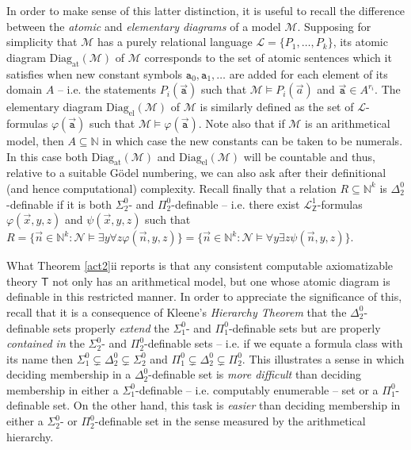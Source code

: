 \documentclass[11pt,fleqn,leqno]{article}
\def\phi{\varphi}
\begin{document}
In order to make sense of this latter distinction, it is useful to recall the difference between the \textsl{atomic} and \textsl{elementary diagrams} of a model $\mathcal{M}$.  Supposing for simplicity that $\mathcal{M}$ has a purely relational language $\mathcal{L} = \{P_1,\ldots,P_k\}$, its atomic diagram $\mathrm{Diag}_{\mathrm{at}}(\mathcal{M})$ of $\mathcal{M}$ corresponds to the set of atomic sentences which it satisfies when new constant symbols $\texttt{a}_0,\texttt{a}_1,\ldots$ are added for each element of its domain $A$ -- i.e. the statements $P_i(\vec{\texttt{a}})$ such that $\mathcal{M} \models P_i(\vec{a})$ and $\vec{\texttt{a}} \in A^{r_i}$.   The elementary diagram $\mathrm{Diag}_{\mathrm{el}}(\mathcal{M})$ of $\mathcal{M}$ is similarly defined as the set of $\mathcal{L}$-formulas $\phi(\vec{\texttt{a}})$ such that $\mathcal{M} \models \phi(\vec{\texttt{a}})$.   Note also that if $\mathcal{M}$ is an arithmetical model, then $A \subseteq \mathbb{N}$ in which case the new constants can be taken to be numerals.   In this case both  $\mathrm{Diag}_{\mathrm{at}}(\mathcal{M})$ and  $\mathrm{Diag}_{\mathrm{el}}(\mathcal{M})$ will be countable and thus, relative to a suitable G\"odel numbering, we can also ask after their definitional (and hence computational) complexity.   Recall finally that a relation $R \subseteq \mathbb{N}^k$ is $\Delta^0_2$-definable if it is both $\Sigma^0_2$- and $\Pi^0_2$-definable -- i.e. there exist $\mathcal{L}^1_{\mathsf{Z}}$-formulas $\phi(\vec{x},y,z)$ and $\psi(\vec{x},y,z)$ such that $R = \{\vec{n} \in \mathbb{N}^k : \mathcal{N} \models \exists y \forall z \phi(\vec{n},y,z)\} =   \{\vec{n} \in \mathbb{N}^k : \mathcal{N} \models \forall y \exists z \psi(\vec{n},y,z)\}$.  

What Theorem \ref{act2}ii reports is  that any consistent computable axiomatizable theory $\mathsf{T}$ not only has an arithmetical model, but one whose atomic diagram is definable in this restricted manner.  In order to appreciate the significance of this, recall that it is a consequence of Kleene's \textsl{Hierarchy Theorem} that the $\Delta^0_2$-definable sets properly \textsl{extend} the $\Sigma^0_1$- and $\Pi^0_1$-definable sets but are properly \textsl{contained in} the $\Sigma^0_2$- and $\Pi^0_2$-definable sets -- i.e. if we equate a formula class with its name then $\Sigma^0_1 \varsubsetneq \Delta^0_2 \subsetneq \Sigma^0_2$ and $\Pi^0_1 \subsetneq \Delta^0_2 \subsetneq \Pi^0_2$.   This illustrates a sense in which deciding membership in a $\Delta^0_2$-definable set is \textsl{more difficult} than deciding membership in either a $\Sigma^0_1$-definable -- i.e. computably enumerable -- set or a $\Pi^0_1$-definable set.   On the other hand, this task is \textsl{easier} than deciding membership in either a $\Sigma^0_2$- or $\Pi^0_2$-definable set in the  sense measured by the arithmetical hierarchy.   
\end{document}
